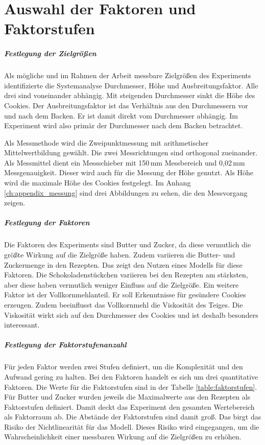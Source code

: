 \chapter{Auswahl der Faktoren und Faktorstufen}\label{ch:studiendesign}

\paragraph{Festlegung der Zielgrößen}
Als mögliche und im Rahmen der Arbeit messbare Zielgrößen des Experiments identifizierte die Systemanalyse Durchmesser, Höhe und Ausbreitungsfaktor.
Alle drei sind voneinander abhängig.
Mit steigenden Durchmesser sinkt die Höhe des Cookies.
Der Ausbreitungsfaktor ist das Verhältnis aus den Durchmessern vor und nach dem Backen.
Er ist damit direkt vom Durchmesser abhängig.
Im Experiment wird also primär der Durchmesser nach dem Backen betrachtet.

Als Messmethode wird die Zweipunktmessung mit arithmetischer Mittelwertbildung gewählt.
Die zwei Messrichtungen sind orthogonal zueinander.
Als Messmittel dient ein Messschieber mit 150\,mm Messbereich und 0,02\,mm Messgenauigkeit.
Dieser wird auch für die Messung der Höhe genutzt.
Als Höhe wird die maximale Höhe des Cookies festgelegt.
Im Anhang \ref{ch:appendix_messung} sind drei Abbildungen zu sehen, die den Messvorgang zeigen.

\paragraph{Festlegung der Faktoren}
Die Faktoren des Experiments sind Butter und Zucker, da diese vermutlich die größte Wirkung auf die Zielgröße haben.
Zudem variieren die Butter- und Zuckermenge in den Rezepten.
Das zeigt den Nutzen eines Modells für diese Faktoren.
Die Schokoladenstückchen variieren bei den Rezepten am stärksten, aber diese haben vermutlich weniger Einfluss auf die Zielgröße.
Ein weitere Faktor ist der Vollkornmehlanteil.
Er soll Erkenntnisse für gesündere Cookies erzeugen.
Zudem beeinflusst das Vollkornmehl die Viskosität des Teiges.
Die Viskosität wirkt sich auf den Durchmesser des Cookies und ist deshalb besonders interessant.

\paragraph{Festlegung der Faktorstufenanzahl}
Für jeden Faktor werden zwei Stufen definiert, um die Komplexität und den Aufwand gering zu halten.
Bei den Faktoren handelt es sich um drei quantitative Faktoren.
Die Werte für die Faktorstufen sind in der Tabelle \ref{table:faktorstufen}.
Für Butter und Zucker wurden jeweils die Maximalwerte aus den Rezepten als Faktorstufen definiert.
Damit deckt das Experiment den gesamten Wertebereich als Faktorraum ab.
Die Abstände der Faktorstufen sind damit groß.
Das birgt das Risiko der Nichtlinearität für das Modell.
Dieses Risiko wird eingegangen, um die Wahrscheinlichkeit einer messbaren Wirkung auf die Zielgrößen zu erhöhen.

